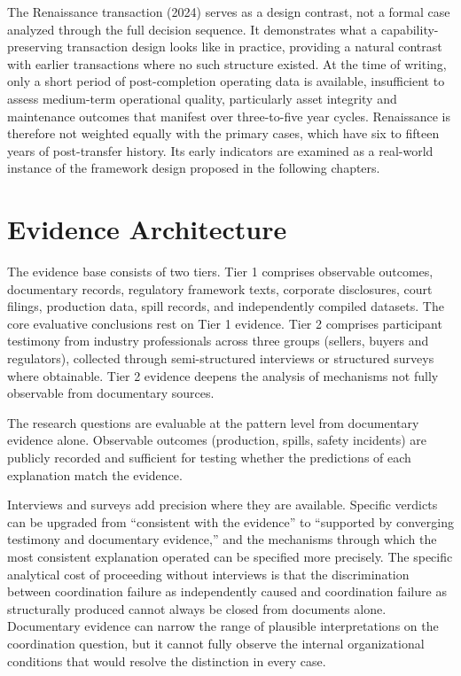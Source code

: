 \documentclass[twoside,fontset=lmodern]{mitthesis}
\begin{document}
The Renaissance transaction (2024) serves as a design contrast, not a
formal case analyzed through the full decision sequence. It demonstrates
what a capability-preserving transaction design looks like in practice,
providing a natural contrast with earlier transactions where no such
structure existed. At the time of writing, only a short period of
post-completion operating data is available, insufficient to assess
medium-term operational quality, particularly asset integrity and
maintenance outcomes that manifest over three-to-five year cycles.
Renaissance is therefore not weighted equally with the primary cases,
which have six to fifteen years of post-transfer history. Its early
indicators are examined as a real-world instance of the framework design
proposed in the following chapters.

\hypertarget{evidence-architecture}{%
\section{Evidence Architecture}\label{evidence-architecture}}

The evidence base consists of two tiers. Tier 1 comprises observable
outcomes, documentary records, regulatory framework texts, corporate
disclosures, court filings, production data, spill records, and
independently compiled datasets. The core evaluative conclusions rest on
Tier 1 evidence. Tier 2 comprises participant testimony from industry
professionals across three groups (sellers, buyers and regulators),
collected through semi-structured interviews or structured surveys where
obtainable. Tier 2 evidence deepens the analysis of mechanisms not fully
observable from documentary sources.

The research questions are evaluable at the pattern level from
documentary evidence alone. Observable outcomes (production, spills,
safety incidents) are publicly recorded and sufficient for testing
whether the predictions of each explanation match the evidence.

Interviews and surveys add precision where they are available. Specific
verdicts can be upgraded from ``consistent with the evidence'' to
``supported by converging testimony and documentary evidence,'' and the
mechanisms through which the most consistent explanation operated can be
specified more precisely. The specific analytical cost of proceeding
without interviews is that the discrimination between coordination
failure as independently caused and coordination failure as structurally
produced cannot always be closed from documents alone. Documentary
evidence can narrow the range of plausible interpretations on the
coordination question, but it cannot fully observe the internal
organizational conditions that would resolve the distinction in every
case.
\end{document}
